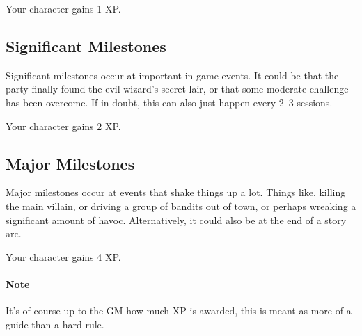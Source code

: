 Your character gains 1 XP.

\subsection{Significant Milestones}
Significant milestones occur at important in-game events.
It could be that the party finally found the evil wizard's secret lair, or that some moderate challenge has been overcome.
If in doubt, this can also just happen every 2--3 sessions.

Your character gains 2 XP.

\subsection{Major Milestones}
Major milestones occur at events that shake things up a lot.
Things like, killing the main villain, or driving a group of bandits out of town, or perhaps wreaking a significant amount of havoc.
Alternatively, it could also be at the end of a story arc.

Your character gains 4 XP.

\paragraph{Note} It's of course up to the GM how much XP is awarded, this is meant as more of a guide than a hard rule.
